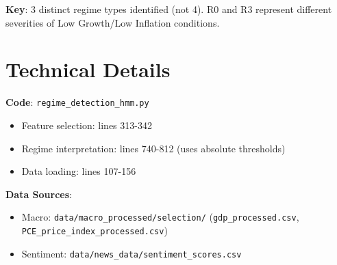 \documentclass[11pt,a4paper]{article}
\begin{document}
\textbf{Key}: 3 distinct regime types identified (not 4). R0 and R3 represent different severities of Low Growth/Low Inflation conditions.

\section{Technical Details}

\textbf{Code}: \texttt{regime\_detection\_hmm.py}
\begin{itemize}[leftmargin=*]
    \item Feature selection: lines 313-342
    \item Regime interpretation: lines 740-812 (uses absolute thresholds)
    \item Data loading: lines 107-156
\end{itemize}

\textbf{Data Sources}:
\begin{itemize}[leftmargin=*]
    \item Macro: \texttt{data/macro\_processed/selection/} (\texttt{gdp\_processed.csv}, \texttt{PCE\_price\_index\_processed.csv})
    \item Sentiment: \texttt{data/news\_data/sentiment\_scores.csv}
\end{itemize}
\end{document}
